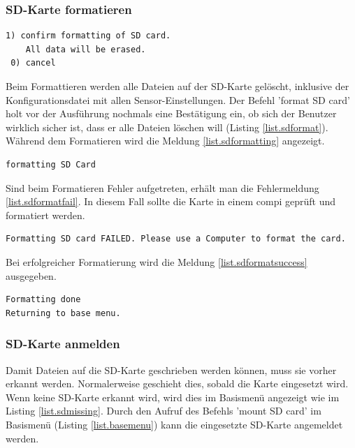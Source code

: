 \subsubsection{SD-Karte formatieren}\label{sssec.sdformat}
\begin{lstlisting}[caption=Untermenü SD-Karte formatieren, label=list.sdformat]
 1) confirm formatting of SD card.
    All data will be erased.
 0) cancel
\end{lstlisting}

Beim Formattieren werden alle Dateien auf der SD-Karte gelöscht, inklusive der Konfigurationsdatei mit allen Sensor-Einstellungen. Der Befehl 'format SD card' holt vor der Ausführung nochmals eine Bestätigung ein, ob sich der Benutzer wirklich sicher ist, dass er alle Dateien löschen will (Listing \ref{list.sdformat}). Während dem Formatieren wird die Meldung \ref{list.sdformatting} angezeigt.

\begin{lstlisting}[caption=Statusmeldung SD formatieren, label=list.sdformatting]
formatting SD Card
\end{lstlisting}

Sind beim Formatieren Fehler aufgetreten, erhält man die Fehlermeldung \ref{list.sdformatfail}. In diesem Fall sollte die Karte in einem \gls{compi} geprüft und formatiert werden.

\begin{lstlisting}[caption=Fehlermeldung SD formatieren, label=list.sdformatfail]
Formatting SD card FAILED. Please use a Computer to format the card.
\end{lstlisting}

Bei erfolgreicher Formatierung wird die Meldung \ref{list.sdformatsuccess} ausgegeben. 

\begin{lstlisting}[caption=Erfolgsmeldung SD formatieren, label=list.sdformatsuccess]
Formatting done
Returning to base menu.
\end{lstlisting}


\subsubsection{SD-Karte anmelden}\label{sssec.sdmount}
Damit Dateien auf die SD-Karte geschrieben werden können, muss sie vorher erkannt werden. Normalerweise geschieht dies, sobald die Karte eingesetzt wird. Wenn keine SD-Karte erkannt wird, wird dies im Basismenü angezeigt wie im Listing \ref{list.sdmissing}. Durch den Aufruf des Befehls 'mount SD card' im Basismenü (Listing \ref{list.basemenu}) kann die eingesetzte SD-Karte angemeldet werden.

